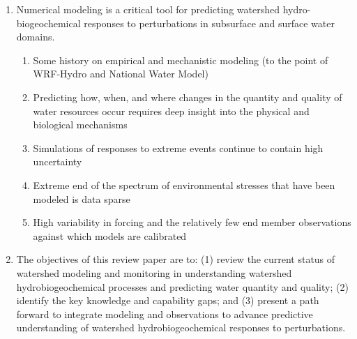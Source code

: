 \documentclass[preprint,review, 12pt]{elsarticle}
\begin{document}
\begin{enumerate}
\item Numerical modeling is a critical tool for predicting watershed hydro-biogeochemical responses to perturbations in subsurface and surface water domains.
    \begin{enumerate}
        \item Some history on empirical and mechanistic modeling (to the point of WRF-Hydro and National Water Model)
        \item Predicting how, when, and where changes in the quantity and quality of water resources occur requires deep insight into the physical and biological mechanisms
        \item Simulations of responses to extreme events continue to contain high uncertainty
        \item Extreme end of the spectrum of environmental stresses that have been modeled is data sparse
        \item High variability in forcing and the relatively few end member observations against which models are calibrated
    \end{enumerate}
    
\item The objectives of this review paper are to: (1) review the current status of watershed modeling and monitoring in understanding watershed hydrobiogeochemical processes and predicting water quantity and quality; (2) identify the key knowledge and capability gaps; and (3) present a path forward to integrate modeling and observations to advance predictive understanding of watershed hydrobiogeochemical responses to perturbations.
\end{enumerate}
\end{document}
